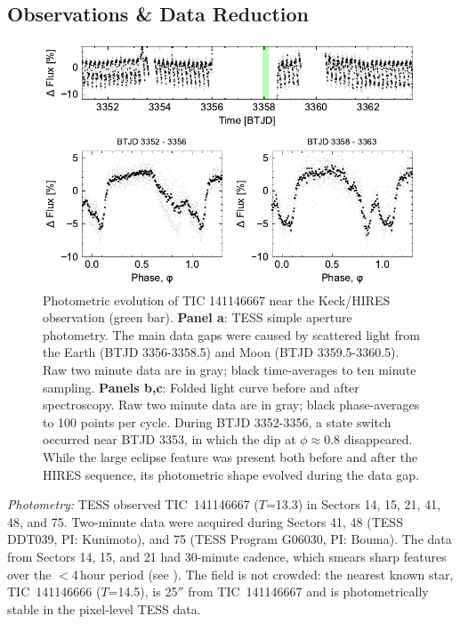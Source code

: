 \documentclass{nature3}
\begin{document}
\newpage
\begin{methods}

\renewcommand{\figurename}{Extended Data Figure}
\renewcommand{\tablename}{Extended Data Table}
\setcounter{table}{0}  
\setcounter{figure}{0}  

\subsection{Observations \& Data Reduction}\phantom{+}

\begin{figure}[!b]
  \centering
  \includegraphics[width=0.99\textwidth]{figures/sf1.pdf}
  \caption{Photometric evolution of TIC 141146667 near the Keck/HIRES observation (green bar). 
  {\bf Panel a}: TESS simple aperture photometry. 
  The main data gaps were caused by scattered light from the Earth
  (BTJD 3356-3358.5) and Moon (BTJD 3359.5-3360.5).
  Raw two minute data are in gray; black time-averages to ten minute
  sampling.
  {\bf Panels b,c}: Folded light curve before and after spectroscopy.
  Raw two minute data are in gray; black phase-averages to 100 points
  per cycle.
  During BTJD 3352-3356, a state switch occurred near BTJD 3353,
  in which the dip at $\phi$$\approx$0.8 disappeared.
  While the large eclipse feature was present both before and after
  the HIRES sequence, its photometric shape evolved during the data
  gap.
  }
  \label{fig:fulllc}
\end{figure}

{\it Photometry:} TESS observed TIC~141146667 ($T$=13.3) in Sectors 14,
15, 21, 41, 48, and 75.  Two-minute data were acquired during Sectors
41, 48 (TESS DDT039, PI: Kunimoto), and 75 (TESS Program G06030, PI:
Bouma).  The data from Sectors 14, 15, and 21 had 30-minute cadence,
which smears sharp features over the $<$4\,hour period (see
\cite{Gunther2022}).  The field is not crowded:  the nearest known
star, TIC~141146666 ($T$=14.5), is 25$''$ from TIC~141146667 and is
photometrically stable in the pixel-level TESS data.


\end{methods}
\end{document}
